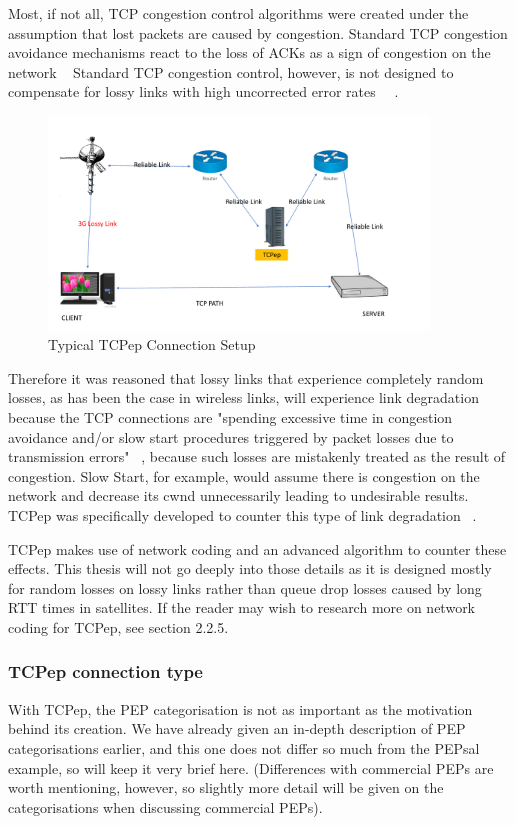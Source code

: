 Most, if not all, TCP congestion control algorithms were created under the assumption that lost packets are caused by congestion. Standard TCP congestion avoidance mechanisms react to the loss of ACKs as a sign of congestion on the network ~\cite{13} Standard TCP congestion control, however, is not designed to compensate for lossy links with high uncorrected error rates ~\cite{13}~\cite{33}.

\begin{figure}[h!]
    \centering
    \includegraphics[width=0.9\textwidth]{TCPep.pdf}
    \caption{Typical TCPep Connection Setup}
    \label{TCPep}
\end{figure}

Therefore it was reasoned that lossy links that experience completely random losses, as has been the case in wireless links, will experience link degradation because the TCP connections are "spending excessive time in congestion avoidance and/or slow start procedures triggered by packet losses due to transmission errors" ~\cite{6}, because such losses are mistakenly treated as the result of congestion. Slow Start, for example, would assume there is congestion on the network and decrease its cwnd unnecessarily leading to undesirable results. TCPep was specifically developed to counter this type of link degradation ~\cite{33}.

TCPep makes use of network coding and an advanced algorithm to counter these effects. This thesis will not go deeply into those details as it is designed mostly for random losses on lossy links rather than queue drop losses caused by long RTT times in satellites. If the reader may wish to research more on network coding for TCPep, see section 2.2.5. 

\subsubsection*{TCPep connection type}
With TCPep, the PEP categorisation is not as important as the motivation behind its creation. We have already given an in-depth description of PEP categorisations earlier, and this one does not differ so much from the PEPsal example, so will keep it very brief here. (Differences with commercial PEPs are worth mentioning, however, so slightly more detail will be given on the categorisations when discussing commercial PEPs). 

